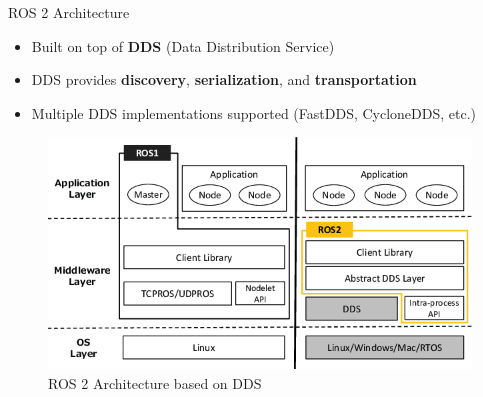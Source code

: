 \begin{frame}{ROS 2 Architecture}

    \begin{itemize}
        \item Built on top of \textbf{DDS} (Data Distribution Service)
        \item DDS provides \textbf{discovery}, \textbf{serialization}, and \textbf{transportation}
        \item Multiple DDS implementations supported (FastDDS, CycloneDDS, etc.)
    \end{itemize}
    \begin{figure}
        \centering
        \includegraphics[width=0.99\textheight]{img/ros2/ROS1-ROS2-architecture-1.png}
        \caption{ROS 2 Architecture based on DDS}
    \end{figure}
\end{frame}

